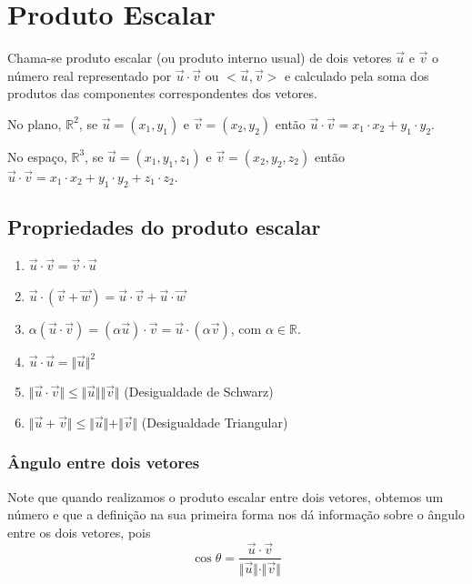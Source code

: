 \chapter{Produto Escalar}

\begin{df} Chama-se produto escalar (ou produto interno usual) de dois vetores $\vec u$ e $\vec v$ o número real representado por $\vec u \cdot \vec v$ ou $<\vec u, \vec v>$ e calculado pela soma dos produtos das componentes correspondentes dos vetores.

No plano, $\mathbb{R}^2$, se $\vec u=(x_1, y_1)$ e $\vec v=(x_2, y_2)$ então $\vec u \cdot \vec v = x_1\cdot x_2 + y_1\cdot y_2$.

No espaço, $\mathbb{R}^3$, se $\vec u=(x_1, y_1, z_1)$ e $\vec v=(x_2, y_2, z_2)$ então $\vec u \cdot \vec v = x_1\cdot x_2 + y_1\cdot y_2+z_1\cdot z_2$.
\end{df}


\section{Propriedades do produto escalar}

\begin{enumerate}[(1)]
\item $\vec u\cdot \vec v=\vec v\cdot \vec u$
\item $\vec u\cdot (\vec v+\vec w)=\vec u\cdot \vec v+\vec u\cdot \vec w$
\item $\alpha(\vec u\cdot \vec v)=(\alpha \vec u)\cdot \vec v=\vec u\cdot (\alpha \vec v)$, com $\alpha \in \mathbb{R}$.
\item $\vec u\cdot \vec u=\Vert \vec u \Vert^2$
\item $\Vert \vec u\cdot \vec v\Vert \leq \Vert \vec u \Vert \Vert \vec v \Vert$ (Desigualdade de Schwarz)
\item $\Vert \vec u + \vec v\Vert \leq \Vert \vec u \Vert+ \Vert \vec v \Vert$ (Desigualdade Triangular)
\end{enumerate}

\subsection{Ângulo entre dois vetores}

Note que quando realizamos o produto escalar entre dois vetores, obtemos um número e que a definição na sua primeira forma nos dá informação sobre o ângulo entre os dois vetores, pois $$\cos{\theta}=\frac{\vec{u} \cdot \vec{v}}{\Vert\vec{u}\Vert \cdot \Vert\vec{v}\Vert}$$

